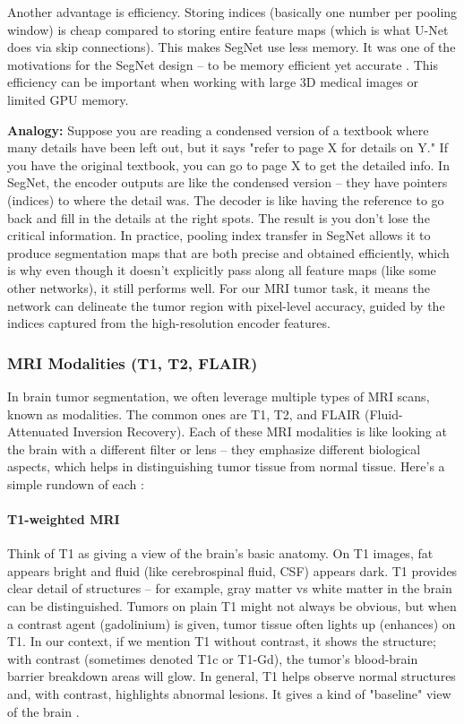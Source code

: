 Another advantage is efficiency. Storing indices (basically one number per pooling window) is cheap compared to storing entire feature maps (which is what U-Net does via skip connections). This makes SegNet use less memory. It was one of the motivations for the SegNet design – to be memory efficient yet accurate \cite{fezan2023segmentation}. This efficiency can be important when working with large 3D medical images or limited GPU memory.

\textbf{Analogy:} Suppose you are reading a condensed version of a textbook where many details have been left out, but it says "refer to page X for details on Y." If you have the original textbook, you can go to page X to get the detailed info. In SegNet, the encoder outputs are like the condensed version – they have pointers (indices) to where the detail was. The decoder is like having the reference to go back and fill in the details at the right spots. The result is you don't lose the critical information. In practice, pooling index transfer in SegNet allows it to produce segmentation maps that are both precise and obtained efficiently, which is why even though it doesn't explicitly pass along all feature maps (like some other networks), it still performs well. For our MRI tumor task, it means the network can delineate the tumor region with pixel-level accuracy, guided by the indices captured from the high-resolution encoder features.

\subsubsection{MRI Modalities (T1, T2, FLAIR)}
\label{sec:mri_modalities}

In brain tumor segmentation, we often leverage multiple types of MRI scans, known as modalities. The common ones are T1, T2, and FLAIR (Fluid-Attenuated Inversion Recovery). Each of these MRI modalities is like looking at the brain with a different filter or lens – they emphasize different biological aspects, which helps in distinguishing tumor tissue from normal tissue. Here's a simple rundown of each \cite{nature2023mri}:

\paragraph{T1-weighted MRI}
Think of T1 as giving a view of the brain's basic anatomy. On T1 images, fat appears bright and fluid (like cerebrospinal fluid, CSF) appears dark. T1 provides clear detail of structures – for example, gray matter vs white matter in the brain can be distinguished. Tumors on plain T1 might not always be obvious, but when a contrast agent (gadolinium) is given, tumor tissue often lights up (enhances) on T1. In our context, if we mention T1 without contrast, it shows the structure; with contrast (sometimes denoted T1c or T1-Gd), the tumor's blood-brain barrier breakdown areas will glow. In general, T1 helps observe normal structures and, with contrast, highlights abnormal lesions. It gives a kind of "baseline" view of the brain \cite{researchgate2023modalities}.

